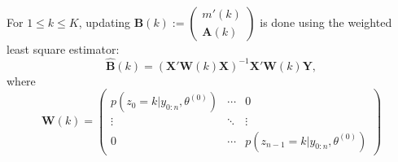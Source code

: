 \documentclass[]{book}
\begin{document}
For \(1 \leq k\leq K\), updating
\(\mathbf{B}(k) := \begin{pmatrix} m'(k)\\ \mathbf{A}(k) \end{pmatrix}\) is done using the weighted least square estimator:
\[\widehat{\mathbf{B}}(k) = \left(\mathbf{X}'\mathbf{W}(k)\mathbf{X} \right)^{-1} \mathbf{X}'\mathbf{W}(k) \mathbf{Y},\]
where
\[\mathbf{W}(k) = \begin{pmatrix}p(z_0 = k\vert y_{0:n}, \theta^{(0)}) & \cdots & 0 \\
\vdots & \ddots & \vdots\\
0 & \cdots & p(z_{n-1} = k\vert y_{0:n}, \theta^{(0)})
\end{pmatrix}\]


\end{document}
